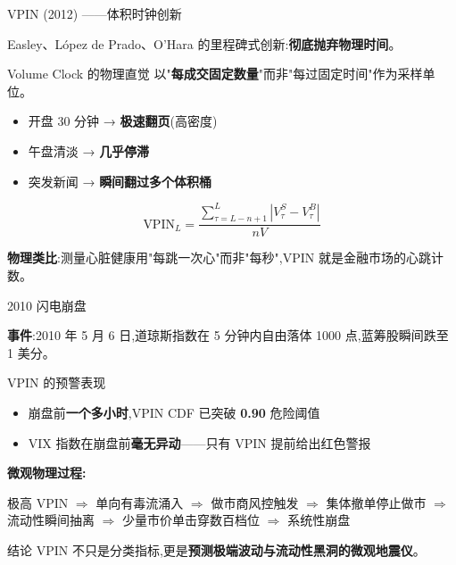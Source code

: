\documentclass[10pt,aspectratio=169]{beamer}
\begin{document}
\begin{frame}{VPIN (2012) ——体积时钟创新}

  Easley、López de Prado、O'Hara 的里程碑式创新:\textbf{彻底抛弃物理时间}。

  \begin{block}{Volume Clock 的物理直觉}
    以"\textbf{每成交固定数量}"而非"每过固定时间"作为采样单位。
    \begin{itemize}
      \item 开盘 30 分钟 → \textbf{极速翻页}(高密度)
      \item 午盘清淡 → \textbf{几乎停滞}
      \item 突发新闻 → \textbf{瞬间翻过多个体积桶}
    \end{itemize}
  \end{block}

  \vfill

  \[
    \text{VPIN}_L = \frac{\sum_{\tau = L-n+1}^{L} |V_\tau^S - V_\tau^B|}{n V}
  \]

  \vfill

  \centering\small
  \textbf{物理类比}:测量心脏健康用"每跳一次心"而非"每秒",VPIN 就是金融市场的心跳计数。
\end{frame}

\begin{frame}{2010 闪电崩盘}

  \textbf{事件}:2010 年 5 月 6 日,道琼斯指数在 5 分钟内自由落体 1000 点,蓝筹股瞬间跌至 1 美分。

  \vfill

  \begin{exampleblock}{VPIN 的预警表现}
    \begin{itemize}
      \item 崩盘前\textbf{一个多小时},VPIN CDF 已突破 \textbf{0.90} 危险阈值
      \item VIX 指数在崩盘前\textbf{毫无异动}——只有 VPIN 提前给出红色警报
    \end{itemize}
  \end{exampleblock}

  \vfill

  \textbf{微观物理过程:}

  \begin{center}
  \footnotesize
  极高 VPIN $\Rightarrow$ 单向有毒流涌入 $\Rightarrow$ 做市商风控触发 $\Rightarrow$
  集体撤单停止做市 $\Rightarrow$ 流动性瞬间抽离 $\Rightarrow$ 少量市价单击穿数百档位 $\Rightarrow$ \alert{系统性崩盘}
  \end{center}

  \vfill

  \begin{alertblock}{结论}
    VPIN 不只是分类指标,更是\textbf{预测极端波动与流动性黑洞的微观地震仪}。
  \end{alertblock}

\end{frame}
\end{document}
